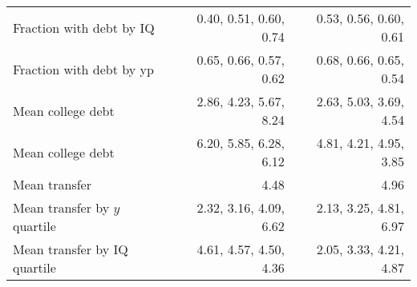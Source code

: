 \begin{tabular}{lrr}
Fraction with debt by IQ & 0.40, 0.51, 0.60, 0.74  & 0.53, 0.56, 0.60, 0.61  \\ 
Fraction with debt by yp & 0.65, 0.66, 0.57, 0.62  & 0.68, 0.66, 0.65, 0.54  \\ 
Mean college debt & 2.86, 4.23, 5.67, 8.24  & 2.63, 5.03, 3.69, 4.54  \\ 
Mean college debt & 6.20, 5.85, 6.28, 6.12  & 4.81, 4.21, 4.95, 3.85  \\ 
Mean transfer & 4.48  & 4.96  \\ 
Mean transfer by $y$ quartile & 2.32, 3.16, 4.09, 6.62  & 2.13, 3.25, 4.81, 6.97  \\ 
Mean transfer by IQ quartile & 4.61, 4.57, 4.50, 4.36  & 2.05, 3.33, 4.21, 4.87  \\ 
\hline
\end{tabular}%

